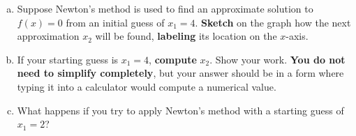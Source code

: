 \documentclass[12pt]{article}
\renewcommand{\emph}[1]{\textsf{\textbf{#1}}}
\begin{document}
\begin{enumerate}[a.]%
	\item Suppose Newton's method is used to find an approximate solution to
	$f(x)=0$ from an initial guess of $x_1=4$. \emph{Sketch} on the graph how the
	next approximation $x_2$ will be found, \emph{labeling}
	its location on the $x$-axis.
	\item If your starting guess is $x_1=4$, \emph{compute} $x_2$. Show your work. \emph{You do not need to simplify completely}, but your answer should be in a
form where typing it into a calculator would compute a numerical value. 
		\vfill
		
		\vfill
	
	\item What happens if you try to apply Newton's method with a starting guess of $x_{1} = 2$?
	\vfill
\end{enumerate}

\newpage
\end{document}
